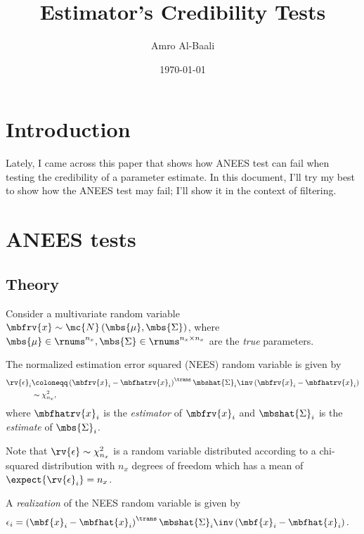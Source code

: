 \documentclass{simple-article}
\title{Estimator's Credibility Tests}
\author{Amro Al-Baali}
\date{\today}
\begin{document}
\maketitle

\section{Introduction}
Lately, I came across this paper \cite{liEvaluationEstimationAlgorithms2012} that shows how ANEES test can fail when testing the credibility of a parameter estimate. In this document, I'll try my best to show how the ANEES test may fail; I'll show it in the context of filtering. 

\section{ANEES tests}
\subsection{Theory}
Consider a multivariate random variable $\mbfrv{x}\sim\mc{N}\left( \mbs{\mu}, \mbs{\Sigma} \right)$, where $\mbs{\mu}\in\rnums^{n_{x}}, \mbs{\Sigma}\in\rnums^{n_{x}\times n_{x}}$ are the \emph{true} parameters. 

The normalized estimation error squared (NEES) random variable is given by
\begin{align}
  \rv{\epsilon}_{i} &\coloneqq \left( \mbfrv{x}_{i} - \mbfhatrv{x}_{i} \right)^{\trans}\mbshat{\Sigma}_{i}\inv\left( \mbfrv{x}_{i} - \mbfhatrv{x}_{i} \right)\\
                    &\sim \chi^{2}_{n_{x}},
\end{align}
where $\mbfhatrv{x}_{i}$ is the \emph{estimator} of $\mbfrv{x}_{i}$ and $\mbshat{\Sigma}_{i}$ is the \emph{estimate} of $\mbs{\Sigma}_{i}$.

\begin{blueBox}
  Note that $\rv{\epsilon}\sim\chi^{2}_{n_{x}}$ is a random variable distributed according to a chi-squared distribution with $n_{x}$ degrees of freedom which has a mean of $\expect{\rv{\epsilon}_{i}} = n_{x}$. 
\end{blueBox}

A \emph{realization} of the NEES random variable is given by
\begin{align}
  \epsilon_{i} &= \left( \mbf{x}_{i} - \mbfhat{x}_{i} \right)^{\trans}\mbshat{\Sigma}_{i}\inv\left( \mbf{x}_{i} - \mbfhat{x}_{i} \right).
\end{align}
\end{document}
